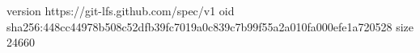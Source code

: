 version https://git-lfs.github.com/spec/v1
oid sha256:448cc44978b508c52dfb39fc7019a0c839c7b99f55a2a010fa000efe1a720528
size 24660
